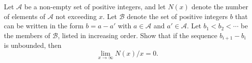 Let $\mathcal{A}$
be a non-empty set of positive integers, and let $N(x)$ denote
the number of elements of $\mathcal{A}$ not exceeding $x$.
Let $\mathcal{B}$ denote the set
of positive integers $b$ that can be written in the form $b = a - a'$ with
$a \in \mathcal{A}$  and $a' \in  \mathcal{A}$. Let $b_1 < b_2 < \cdots$
be the members of $\mathcal{B}$,
listed in increasing order. Show that if the sequence $b_{i+1} - b_i$ is
unbounded, then
\[
\lim_{x \to\infty}  N(x)/x  = 0.
\]
